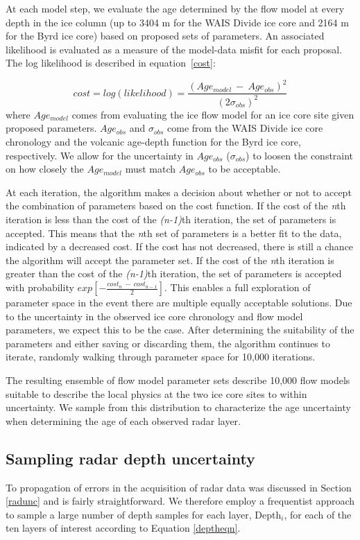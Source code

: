 \documentclass[12pt]{article}
\begin{document}
At each model step, we evaluate the age determined by the flow model at every depth in the ice column (up to 3404 m for the WAIS Divide ice core and 2164 m for the Byrd ice core) based on proposed sets of parameters.  An associated likelihood is evaluated as a measure of the model-data misfit for each proposal. The log likelihood is described in equation~\ref{cost}:

\begin{equation}\label{cost}
cost = log(likelihood) = \frac{(Age_{model}~ - ~Age_{obs})^2}{(2\sigma_{obs})^2}
\end{equation}
where $Age_{model}$ comes from evaluating the ice flow model for an ice core site given proposed parameters. $Age_{obs}$ and $\sigma_{obs}$ come from the WAIS Divide ice core chronology and the volcanic age-depth function for the Byrd ice core, respectively. We allow for the uncertainty in $Age_{obs}$ ($\sigma_{obs}$) to loosen the constraint on how closely the $Age_{model}$ must match $Age_{obs}$ to be acceptable. 

At each iteration, the algorithm makes a decision about whether or not to accept the combination of parameters based on the cost function. If the cost of the \textit{n}th iteration is less than the cost of the \textit{(n-1)}th iteration, the set of parameters is accepted. This means that the \textit{n}th set of parameters is a better fit to the data, indicated by a decreased cost. If the cost has not decreased, there is still a chance the algorithm will accept the parameter set. If the cost of the \textit{n}th iteration is greater than the cost of the \textit{(n-1)}th iteration, the set of parameters is accepted with probability $exp[-\frac{cost_n~-~cost_{n-1}}{2}]$. This enables a full exploration of parameter space in the event there are multiple equally acceptable solutions. Due to the uncertainty in the observed ice core chronology and flow model parameters, we expect this to be the case. After determining the suitability of the parameters and either saving or discarding them, the algorithm continues to iterate, randomly walking through parameter space for 10,000 iterations. 

The resulting ensemble of flow model parameter sets describe 10,000 flow models suitable to describe the local physics at the two ice core sites to within uncertainty. We sample from this distribution to characterize the age uncertainty when determining the age of each observed radar layer.

\subsection{Sampling radar depth uncertainty}
To propagation of errors in the acquisition of radar data was discussed in Section \ref{radunc} and is fairly straightforward. We therefore employ a frequentist approach to sample a large number of depth samples for each layer, Depth$_i$, for each of the ten layers of interest according to Equation \ref{deptheqn}. 
\end{document}
